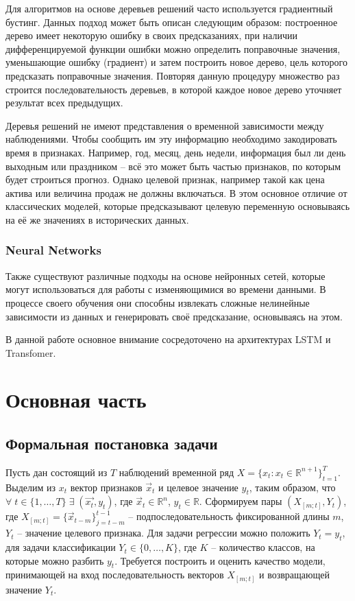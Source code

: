 \documentclass[diploma]{nanolab2015}
\begin{document}
Для алгоритмов на основе деревьев решений часто используется градиентный бустинг. Данных подход может быть описан следующим образом: построенное дерево имеет некоторую ошибку в своих предсказаниях, при наличии дифференцируемой функции ошибки можно определить поправочные значения, уменьшающие ошибку (градиент) и затем построить новое дерево, цель которого предсказать поправочные значения. Повторяя данную процедуру множество раз строится последовательность деревьев, в которой каждое новое дерево уточняет результат всех предыдущих\cite{book6}.

Деревья решений не имеют представления о временной зависимости между наблюдениями. Чтобы сообщить им эту информацию необходимо закодировать время в признаках. Например, год, месяц, день недели, информация был ли день выходным или праздником -- всё это может быть частью признаков, по которым будет строиться прогноз. Однако целевой признак, например такой как цена актива или величина продаж не должны включаться. В этом основное отличие от классических моделей, которые предсказывают целевую переменную основываясь на её же значениях в исторических данных.

\subsection{Neural Networks}
Также существуют различные подходы на основе нейронных сетей, которые могут использоваться для работы с изменяющимися во времени данными. В процессе своего обучения они способны извлекать сложные нелинейные зависимости из данных и генерировать своё предсказание, основываясь на этом.

В данной работе основное внимание сосредоточено на архитектурах LSTM и Transfomer.

\chapter{Основная часть}
\section{Формальная постановка задачи}
Пусть дан состоящий из $T$ наблюдений временной ряд
$
    X = \{x_t : x_t \in \mathbb{R}^{n+1}\}_{t=1}^T
$.
Выделим из $x_t$ вектор признаков $\vec{x}_t$ и целевое значение $y_t$, таким образом, что
$
    \forall \; t \in \{1, \dotsc, T\} \; \exists \; (\vec{x_t}, y_t)
$,
где $\vec{x}_t \in \mathbb{R}^n $, $y_t \in \mathbb{R}$.
Сформируем пары
$
    (X_{[m;t]}, Y_{t})
$,
где
$
    X_{[m;t]} = \{\vec{x}_{t-m}\}_{j=t-m}^{t-1}
$ -- подпоследовательность фиксированной длины $m$, $Y_t$ -- значение целевого признака.
Для задачи регрессии можно положить $Y_t = y_t$, для задачи классификации
$Y_t \in \{0, \dotsc, K\}$, где $K$ -- количество классов, на которые можно разбить $y_t$.
Требуется построить и оценить качество модели, принимающей на вход последовательность векторов $X_{[m;t]}$ и возвращающей значение $Y_t$.
\end{document}
